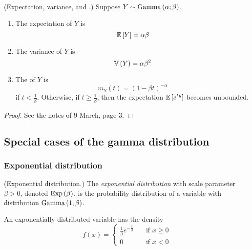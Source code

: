 \documentclass[11pt]{article}
\begin{document}
\begin{thm}{(Expectation, variance, and \mgf{}.)}
    Suppose $Y \sim \operatorname{Gamma}\left(\alpha;\beta\right)$.
    \begin{enumerate}
        \item
            The expectation of $Y$ is
            \begin{equation*}
                \operatorname{\mathbb{E}}{\left[Y\right]} = \alpha \beta
            \end{equation*}
        \item
            The variance of $Y$ is
            \begin{equation*}
                \operatorname{\mathbb{V}}{\left(Y\right)} = \alpha \beta^2
            \end{equation*}
        \item
            The \mgf{} of $Y$ is
            \begin{equation*}
                m_Y(t) = (1 - \beta t)^{-\alpha}
            \end{equation*}
            if $t < \frac{1}{\beta}$.
            Otherwise, if $t \geq \frac{1}{\beta}$,
            then the expectation $\operatorname{\mathbb{E}}{\left[e^{ty}\right]}$ becomes unbounded.
    \end{enumerate}
\end{thm}

\begin{proof}
    See the notes of 9 March, page 3.
\end{proof}

\subsection{Special cases of the gamma distribution}

\subsubsection{Exponential distribution}

\begin{defn}{(Exponential distribution.)}
    The \emph{exponential distribution} with scale parameter $\beta > 0$,
    denoted $\operatorname{Exp}\left(\beta\right)$,
    is the probability distribution of a variable with distribution
    $\operatorname{Gamma}\left(1, \beta\right)$.

    An exponentially distributed variable has the density
    \begin{equation*}
        f(x) = \begin{cases}
            \frac{1}{\beta} e^{-\frac{x}{\beta}}
                &\quad\text{if } x \geq 0
            \\
            0
                &\quad\text{if } x < 0
        \end{cases}
    \end{equation*}
\end{defn}
\end{document}
